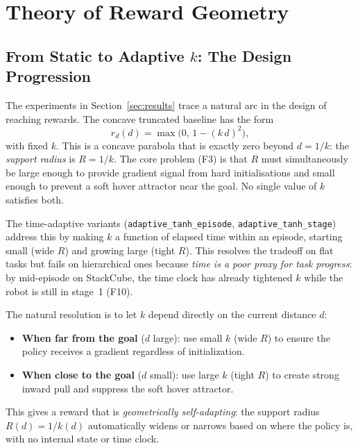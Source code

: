 \documentclass{article}
\begin{document}
\section{Theory of Reward Geometry}
\label{sec:theory}

\subsection{From Static to Adaptive $k$: The Design Progression}

The experiments in Section~\ref{sec:results} trace a natural arc in the design of
reaching rewards. The concave truncated baseline has the form
\begin{equation}
    r_d(d) = \max\!\bigl(0,\, 1 - (k\,d)^2\bigr),
\end{equation}
with fixed $k$. This is a concave parabola that is exactly zero beyond $d = 1/k$: the
\emph{support radius} is $R = 1/k$. The core problem (F3) is that $R$ must simultaneously
be large enough to provide gradient signal from hard initialisations and small enough to
prevent a soft hover attractor near the goal. No single value of $k$ satisfies both.

The time-adaptive variants (\texttt{adaptive\_tanh\_episode}, \texttt{adaptive\_tanh\_stage})
address this by making $k$ a function of elapsed time within an episode, starting small
(wide $R$) and growing large (tight $R$). This resolves the tradeoff on flat tasks but
fails on hierarchical ones because \emph{time is a poor proxy for task progress}: by
mid-episode on StackCube, the time clock has already tightened $k$ while the robot is
still in stage~1 (F10).

The natural resolution is to let $k$ depend directly on the current distance $d$:
\begin{itemize}
    \item \textbf{When far from the goal} ($d$ large): use small $k$ (wide $R$) to ensure
    the policy receives a gradient regardless of initialization.
    \item \textbf{When close to the goal} ($d$ small): use large $k$ (tight $R$) to
    create strong inward pull and suppress the soft hover attractor.
\end{itemize}
This gives a reward that is \emph{geometrically self-adapting}: the support radius
$R(d) = 1/k(d)$ automatically widens or narrows based on where the policy is, with
no internal state or time clock.
\end{document}
